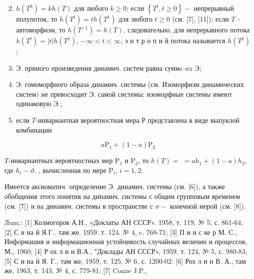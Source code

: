 \documentclass[10pt]{article}
\begin{document}
\begin{enumerate}

  \setcounter{enumi}{1}

  \item $h\left(T^{k}\right)=k h(T)$ для любого $k \geqslant 0$; если $\left\{T^{t}, t \geqslant 0\right\}-$ непрерывный полупоток, то $h\left(T^{t}\right)=t h\left(T^{1}\right)$ для любого $t \geqslant 0$ (см. [7], [11]); если $T$ - автоморфизм, то $h\left(T^{-1}\right)=h(T)$, следовательно, для непрерывного потока $h\left(T^{t}\right)=|t| h\left(T^{1}\right)$, $-\infty<t<\infty$, э н т р о п и й потока называется $h\left(T^{1}\right)$;



  \item Э. прямого произведения динамич. систем равна суммe ux $Э$;



  \item Э. гомоморфного образа динамич. системы (см. Изоморфизм динамических систем) не превосходит Э. самой системы; изоморфные системы имеют одинаковую Э.;



  \item если $T$-инвариантная вероятностная мера Р представлена в виде выпуклой комбинации



\end{enumerate}



\[

a \mathrm{P}_{1}+(1-a) \mathrm{P}_{2}

\]



$T$-инвариантных вероятностных мер $\mathrm{P}_{1}$ и $\mathrm{P}_{2}$, то $h(T)=$ $=a h_{1}+(1-a) h_{2}$, где $h_{i}-\vartheta$. , вычисленная по мере $\mathrm{P}_{i}$, $i=1,2$.



Имеется аксиоматич. определение Э. динамич. системы (см. [6]), а также обобщения этого понятия на динамич. системы с общим групповым временем (см. [7]) и на динамич. системы в пространстве с $\sigma-$ конечной мерой (см. [8]).



Лum.: [1] Колмогоров А.Н., «Доклаты АН СССР». 1958, т. 119, № 5, с. 861-64; [2] С и на й Я.Г.. там же. 1959. т. 124. № 4, c. 768-71; [3] П и н с ке р М. С., Информашия и информашионная устойчивость случайных величин и процессов, М., 1960; [4] Р ох л и н В.А., "Доклады АН СССР», 1959, т. 124, № 5, с. 980-83; [5] С и на й Я. Г., там же, 1959, т. 125, № 6, с. 1200-02: [6] Рох л и н В. А., там же, 1963, т. 143, № 4, с. 779-81; [7] Conze J.P.,
\end{document}
